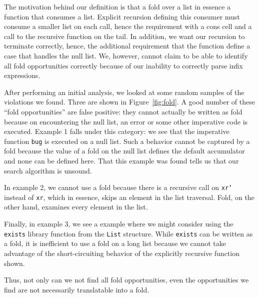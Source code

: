 \documentclass[12pt,abstracton]{scrartcl}
\begin{document}
The motivation behind our definition is that a fold over a list in essence
a function that consumes a list. Explicit recursion defining this consumer must
consume a smaller list on each call, hence the requirement with a cons cell and a
call to the recursive function on the tail. In addition, we want our recursion to terminate
correctly, hence, the additional requirement that the function define a case that handles
the null list.
We, however, cannot claim to be able to identify all
fold opportunities correctly because of our inability
to correctly parse infix expressions.

After performing an initial analysis, we looked at some
random samples of the violations we found.
Three are shown in Figure~\ref{fig:fold}.
A good number of these ``fold opportunities'' are false positive: they cannot actually
be written as fold because on encountering the null list, an error or
some other imperative code is executed. Example 1 falls under this category:
we see that the imperative function \texttt{bug} is executed
on a null list.
Such a behavior cannot be captured by a fold because the value of a
fold on the null list defines the default accumulator and none
can be defined here.
That this example was found tells us that our search algorithm is unsound.

In example 2, we cannot use a fold because
there is a recursive call on \texttt{xr'} instead of \texttt{xr},
which in essence, skips an element in the list traversal.
Fold, on the other hand, examines every element in the list.

Finally, in example 3, we see a example where we might consider
using the \texttt{exists} library function from the \texttt{List}
structure. While \texttt{exists} can be written as a fold,
it is inefficient to use a fold on a long list because
we cannot take advantage of the short-circuiting behavior
of the explicitly recursive function shown.

Thus, not only can we not find all fold opportunities,
even the opportunities we find are not necessarily
translatable into a fold.
\end{document}
